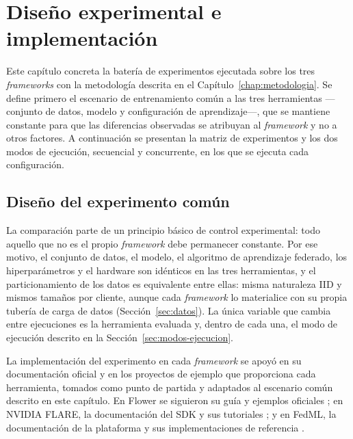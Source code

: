 \chapter{Diseño experimental e implementación}\label{chap:experimentos}

\providecommand{\FloatBarrier}{\clearpage}

Este capítulo concreta la batería de experimentos ejecutada sobre los tres \textit{frameworks}
con la metodología descrita en el Capítulo~\ref{chap:metodologia}. Se define primero el escenario
de entrenamiento común a las tres herramientas —conjunto de datos, modelo y configuración de
aprendizaje—, que se mantiene constante para que las diferencias observadas se atribuyan al
\textit{framework} y no a otros factores. A continuación se presentan la matriz de experimentos y
los dos modos de ejecución, secuencial y concurrente, en los que se ejecuta cada configuración.

\section{Diseño del experimento común}\label{sec:diseno-comun}

La comparación parte de un principio básico de control experimental: todo aquello que no es el
propio \textit{framework} debe permanecer constante. Por ese motivo, el conjunto de datos, el
modelo, el algoritmo de aprendizaje federado, los hiperparámetros y el
hardware son idénticos en las tres herramientas, y el particionamiento de los datos es
equivalente entre ellas: misma naturaleza IID y mismos tamaños por cliente, aunque cada
\textit{framework} lo materialice con su propia tubería de carga de datos
(Sección~\ref{sec:datos}). La única variable que cambia entre ejecuciones
es la herramienta evaluada y, dentro de cada una, el modo de ejecución descrito en la
Sección~\ref{sec:modos-ejecucion}.

La implementación del experimento en cada \textit{framework} se apoyó en su documentación
oficial y en los proyectos de ejemplo que proporciona cada herramienta, tomados
como punto de partida y adaptados al escenario común descrito en este capítulo.
En Flower se siguieron su guía y ejemplos oficiales \parencite{beutel2020flower}; en
NVIDIA FLARE, la documentación del SDK y sus tutoriales \parencite{roth2022nvflare}; y
en FedML, la documentación de la plataforma y sus implementaciones de referencia
\parencite{he2020fedml}.

